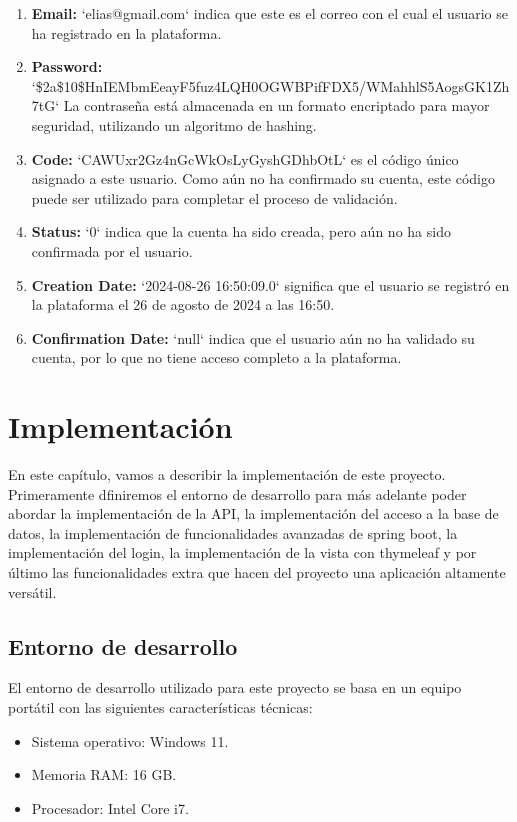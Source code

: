 \documentclass[draft]{scrbook}
\begin{document}
\begin{enumerate}
    \item \textbf{Email:} `elias@gmail.com` indica que este es el correo con el cual el usuario se ha registrado en la plataforma.
    \item \textbf{Password:} `\$2a\$10\$HnIEMbmEeayF5fuz4LQH0OGWBPifFDX5/WMahhlS5AogsGK1Zh7tG` La contraseña está almacenada en un formato encriptado para mayor seguridad, utilizando un algoritmo de hashing.
    \item \textbf{Code:} `CAWUxr2Gz4nGcWkOsLyGyshGDhbOtL` es el código único asignado a este usuario. Como aún no ha confirmado su cuenta, este código puede ser utilizado para completar el proceso de validación.
    \item \textbf{Status:} `0` indica que la cuenta ha sido creada, pero aún no ha sido confirmada por el usuario.
    \item \textbf{Creation Date:} `2024-08-26 16:50:09.0` significa que el usuario se registró en la plataforma el 26 de agosto de 2024 a las 16:50.
    \item \textbf{Confirmation Date:} `null` indica que el usuario aún no ha validado su cuenta, por lo que no tiene acceso completo a la plataforma.
\end{enumerate}




\chapter{Implementación} \label{implementacion}

En este capítulo, vamos a describir la implementación de este proyecto. Primeramente dfiniremos el entorno de desarrollo para más adelante poder abordar la implementación de la API, la implementación del acceso a la base de datos, la implementación de funcionalidades avanzadas de spring boot, la implementación del login, la implementación de la vista con thymeleaf y por último las funcionalidades extra que hacen del proyecto una aplicación altamente versátil.

\section{Entorno de desarrollo}

El entorno de desarrollo utilizado para este proyecto se basa en un equipo portátil con las siguientes características técnicas:

\begin{itemize}
    \item Sistema operativo: Windows 11.
    \item Memoria RAM: 16 GB.
    \item Procesador: Intel Core i7.
\end{itemize}
\end{document}
